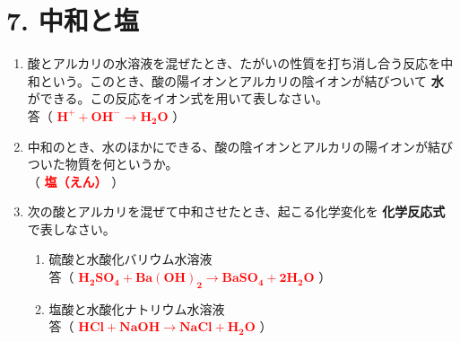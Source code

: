 \section*{7. 中和と塩}
\begin{enumerate}
    \item 酸とアルカリの水溶液を混ぜたとき、たがいの性質を打ち消し合う反応を中和という。このとき、酸の陽イオンとアルカリの陰イオンが結びついて \textbf{水} ができる。この反応をイオン式を用いて表しなさい。\\[0.2cm]
    答（ \textcolor{red}{$\mathbf{H^+ + OH^- \rightarrow H_2O}$} ）
    \item 中和のとき、水のほかにできる、酸の陰イオンとアルカリの陽イオンが結びついた物質を何というか。\\[0.2cm]
    （ \textcolor{red}{\textbf{塩（えん）}} ）
    \item 次の酸とアルカリを混ぜて中和させたとき、起こる化学変化を \textbf{化学反応式} で表しなさい。
    \begin{enumerate}
        \item 硫酸と水酸化バリウム水溶液 \\[0.3cm]
        答（ \textcolor{red}{$\mathbf{H_2SO_4 + Ba(OH)_2 \rightarrow BaSO_4 + 2H_2O}$} ）\\[0.3cm]
        \item 塩酸と水酸化ナトリウム水溶液 \\[0.3cm]
        答（ \textcolor{red}{$\mathbf{HCl + NaOH \rightarrow NaCl + H_2O}$} ）
    \end{enumerate}
\end{enumerate}
